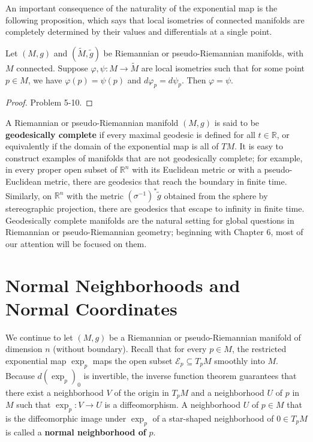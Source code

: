 An important consequence of the naturality of the exponential map is the following proposition, which says that local isometries of connected manifolds are completely determined by their values and differentials at a single point.

\begin{proposition}
\label{prop:local-isometries-completely-determined}
Let $(M, g)$ and $(\tilde{M}, \tilde{g})$ be Riemannian or pseudo-Riemannian manifolds, with $M$ connected. Suppose $\varphi, \psi: M \to \tilde{M}$ are local isometries such that for some point $p \in M$, we have $\varphi(p) = \psi(p)$ and $d\varphi_p = d\psi_p$. Then $\varphi = \psi$.

\begin{proof}
Problem 5-10.
\end{proof}
\end{proposition}

A Riemannian or pseudo-Riemannian manifold $(M, g)$ is said to be \textbf{geodesically complete} if every maximal geodesic is defined for all $t \in \mathbb{R}$, or equivalently if the domain of the exponential map is all of $TM$. It is easy to construct examples of manifolds that are not geodesically complete; for example, in every proper open subset of $\mathbb{R}^n$ with its Euclidean metric or with a pseudo-Euclidean metric, there are geodesics that reach the boundary in finite time. Similarly, on $\mathbb{R}^n$ with the metric $(\sigma^{-1})^*\tilde{g}$ obtained from the sphere by stereographic projection, there are geodesics that escape to infinity in finite time. Geodesically complete manifolds are the natural setting for global questions in Riemannian or pseudo-Riemannian geometry; beginning with Chapter 6, most of our attention will be focused on them.

\section{Normal Neighborhoods and Normal Coordinates}

We continue to let $(M, g)$ be a Riemannian or pseudo-Riemannian manifold of dimension $n$ (without boundary). Recall that for every $p \in M$, the restricted exponential map $\exp_p$ maps the open subset $\mathcal{E}_p \subseteq T_p M$ smoothly into $M$. Because $d(\exp_p)_0$ is invertible, the inverse function theorem guarantees that there exist a neighborhood $V$ of the origin in $T_p M$ and a neighborhood $U$ of $p$ in $M$ such that $\exp_p: V \to U$ is a diffeomorphism. A neighborhood $U$ of $p \in M$ that is the diffeomorphic image under $\exp_p$ of a star-shaped neighborhood of $0 \in T_p M$ is called a \textbf{normal neighborhood of } $p$.

